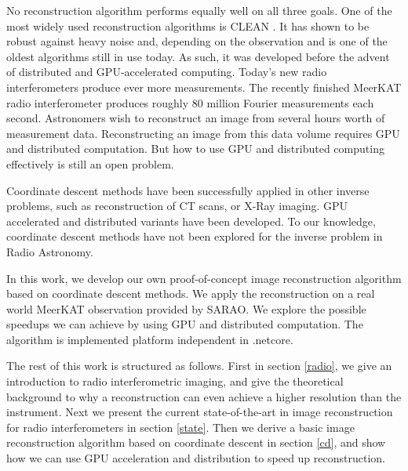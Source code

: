 No reconstruction algorithm performs equally well on all three goals. One of the most widely used reconstruction algorithms is CLEAN \cite{hogbom1974aperture, rau2011multi}. It has shown to be robust against heavy noise and, depending on the observation and is one of the oldest algorithms still in use today. As such, it was developed before the advent of distributed and GPU-accelerated computing. Today's new radio interferometers produce ever more measurements. The recently finished MeerKAT radio interferometer produces roughly 80 million Fourier measurements each second. Astronomers wish to reconstruct an image from several hours worth of measurement data. Reconstructing an image from this data volume requires GPU and distributed computation. But how to use GPU and distributed computing effectively is still an open problem.

Coordinate descent methods have been successfully applied in other inverse problems, such as reconstruction of CT scans\cite{bouman1996unified}, or X-Ray imaging\cite{felix2017compressed}. GPU accelerated\cite{mcgaffin2015edge} and distributed\cite{fercoq2014fast} variants have been developed. To our knowledge, coordinate descent methods have not been explored for the inverse problem in Radio Astronomy.

In this work, we develop our own proof-of-concept image reconstruction algorithm based on coordinate descent methods. We apply the reconstruction on a real world MeerKAT observation provided by SARAO. We explore the possible speedups we can achieve by using GPU and distributed computation. The algorithm is implemented platform independent in .netcore.

The rest of this work is structured as follows. First in section \ref{radio}, we give an introduction to radio interferometric imaging, and give the theoretical background to why a reconstruction can even achieve a higher resolution than the instrument. Next we present the current state-of-the-art in image reconstruction for radio interferometers in section \ref{state}. Then we derive a basic image reconstruction algorithm based on coordinate descent in section \ref{cd}, and show how we can use GPU acceleration and distribution to speed up reconstruction.

